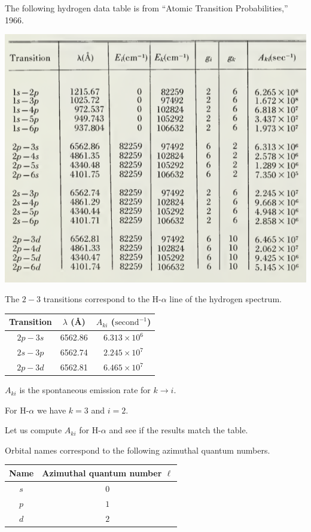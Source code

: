 \documentclass[12pt]{article}
\begin{document}
The following hydrogen data table is from ``Atomic Transition Probabilities,'' 1966.

\begin{center}
\includegraphics[scale=0.5]{h-alpha-line.png}
\end{center}

The $2-3$ transitions correspond to the H-$\alpha$ line of the hydrogen spectrum.
\begin{center}
\begin{tabular}{|c|c|c|}
\hline
Transition & $\lambda$ (\AA) & $A_{ki}$ ($\text{second}^{-1}$)
\\
\hline
$2p-3s$ & 6562.86 & $6.313\times10^6$
\\
$2s-3p$ & 6562.74 & $2.245\times10^7$
\\
$2p-3d$ & 6562.81 & $6.465\times10^7$
\\
\hline
\end{tabular}
\end{center}

$A_{ki}$ is the spontaneous emission rate for $k\rightarrow i$.

\bigskip
For H-$\alpha$ we have $k=3$ and $i=2$.

\bigskip
Let us compute $A_{ki}$ for H-$\alpha$ and see if the results match the table.

\bigskip
Orbital names correspond to the following azimuthal quantum numbers.
\begin{center}
\begin{tabular}{|c|c|}
\hline
Name & Azimuthal quantum number $\ell$
\\
\hline
$s$ & $0$
\\
$p$ & $1$
\\
$d$ & $2$
\\
\hline
\end{tabular}
\end{center}
\end{document}
